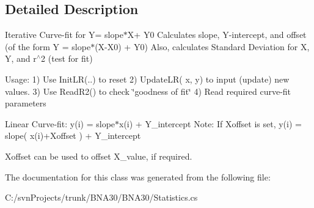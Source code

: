 \subsection{Detailed Description}
Iterative Curve-\/fit for Y= slope$\ast$\+X+ Y0 Calculates slope, Y-\/intercept, and offset (of the form Y = slope$\ast$(X-\/\+X0) + Y0) Also, calculates Standard Deviation for X, Y, and r$^\wedge$2 (test for fit) 

Usage\+: 1) Use Init\+LR(..) to reset 2) Update\+L\+R( x, y) to input (update) new values. 3) Use Read\+R2() to check \char`\"{}goodness of fit\char`\"{} 4) Read required curve-\/fit parameters

Linear Curve-\/fit\+: y(i) = slope$\ast$x(i) + Y\+\_\+intercept Note\+: If Xoffset is set, y(i) = slope( x(i)+Xoffset ) + Y\+\_\+intercept

Xoffset can be used to offset X\+\_\+value, if required. 

The documentation for this class was generated from the following file\+:\begin{DoxyCompactItemize}
\item 
C\+:/svn\+Projects/trunk/\+B\+N\+A30/\+B\+N\+A30/Statistics.\+cs\end{DoxyCompactItemize}

